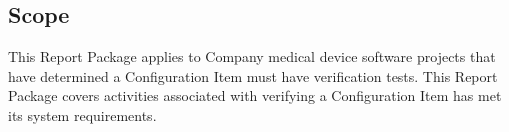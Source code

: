 \subsection{Scope}
This Report Package applies to Company medical device software projects that
have determined a Configuration Item must have verification tests.  This Report
Package covers activities associated with verifying a Configuration Item has met
its system requirements.
